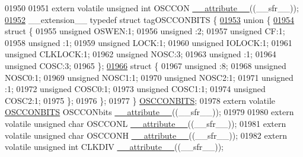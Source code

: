 \begin{DoxyCode}
01950 
01951 \textcolor{keyword}{extern} \textcolor{keyword}{volatile} \textcolor{keywordtype}{unsigned} \textcolor{keywordtype}{int}  OSCCON \hyperlink{a00015_a493c46f03454991ccc5aa7a6e1dfb2a7}{\_\_attribute\_\_}((\_\_sfr\_\_));
\hypertarget{a00015_source_l01952}{}\hyperlink{a00014}{01952} \_\_extension\_\_ \textcolor{keyword}{typedef} \textcolor{keyword}{struct }tagOSCCONBITS \{
\hypertarget{a00015_source_l01953}{}\hyperlink{a00015}{01953}   \textcolor{keyword}{union }\{
\hypertarget{a00015_source_l01954}{}\hyperlink{a00015}{01954}     \textcolor{keyword}{struct }\{
01955       \textcolor{keywordtype}{unsigned} OSWEN:1;
01956       \textcolor{keywordtype}{unsigned} :2;
01957       \textcolor{keywordtype}{unsigned} CF:1;
01958       \textcolor{keywordtype}{unsigned} :1;
01959       \textcolor{keywordtype}{unsigned} LOCK:1;
01960       \textcolor{keywordtype}{unsigned} IOLOCK:1;
01961       \textcolor{keywordtype}{unsigned} CLKLOCK:1;
01962       \textcolor{keywordtype}{unsigned} NOSC:3;
01963       \textcolor{keywordtype}{unsigned} :1;
01964       \textcolor{keywordtype}{unsigned} COSC:3;
01965     \};
\hypertarget{a00015_source_l01966}{}\hyperlink{a00015}{01966}     \textcolor{keyword}{struct }\{
01967       \textcolor{keywordtype}{unsigned} :8;
01968       \textcolor{keywordtype}{unsigned} NOSC0:1;
01969       \textcolor{keywordtype}{unsigned} NOSC1:1;
01970       \textcolor{keywordtype}{unsigned} NOSC2:1;
01971       \textcolor{keywordtype}{unsigned} :1;
01972       \textcolor{keywordtype}{unsigned} COSC0:1;
01973       \textcolor{keywordtype}{unsigned} COSC1:1;
01974       \textcolor{keywordtype}{unsigned} COSC2:1;
01975     \};
01976   \};
01977 \} \hyperlink{a00014_d1/daa/a00638}{OSCCONBITS};
01978 \textcolor{keyword}{extern} \textcolor{keyword}{volatile} \hyperlink{a00014_d1/daa/a00638}{OSCCONBITS} OSCCONbits \hyperlink{a00015_a493c46f03454991ccc5aa7a6e1dfb2a7}{\_\_attribute\_\_}((\_\_sfr\_\_));
01979 
01980 \textcolor{keyword}{extern} \textcolor{keyword}{volatile} \textcolor{keywordtype}{unsigned} \textcolor{keywordtype}{char} OSCCONL \hyperlink{a00015_a493c46f03454991ccc5aa7a6e1dfb2a7}{\_\_attribute\_\_}((\_\_sfr\_\_));
01981 \textcolor{keyword}{extern} \textcolor{keyword}{volatile} \textcolor{keywordtype}{unsigned} \textcolor{keywordtype}{char} OSCCONH \hyperlink{a00015_a493c46f03454991ccc5aa7a6e1dfb2a7}{\_\_attribute\_\_}((\_\_sfr\_\_));
01982 \textcolor{keyword}{extern} \textcolor{keyword}{volatile} \textcolor{keywordtype}{unsigned} \textcolor{keywordtype}{int}  CLKDIV \hyperlink{a00015_a493c46f03454991ccc5aa7a6e1dfb2a7}{\_\_attribute\_\_}((\_\_sfr\_\_));

\end{DoxyCode}
